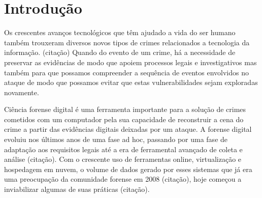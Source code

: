 \documentclass[
	12pt,				%
	openright,			%
	oneside,			%
	a4paper,			%
	english,			%
	french,				%
	spanish,			%
	brazil,				%
	]{abntex2}
\begin{document}
\frenchspacing 


\imprimircapa

\imprimirfolhaderosto


\tableofcontents
\cleardoublepage


\textual

\chapter{Introdução}

Os crescentes avanços tecnológicos que têm ajudado a vida do ser humano também trouxeram diversos novos tipos de crimes relacionados a tecnologia da informação. (citação)
Quando do evento de um crime, há a necessidade de preservar as evidências de modo que apoiem processos legais e investigativos mas também para que possamos compreender a sequência
de eventos envolvidos no ataque de modo que possamos evitar que estas vulnerabilidades sejam exploradas novamente.

\par

Ciência forense digital é uma ferramenta importante para a solução de crimes cometidos com um computador pela sua capacidade de reconstruir a cena do crime a partir das evidências
digitais deixadas por um ataque. A forense digital evoluiu nos últimos anos de uma fase ad hoc, passando por uma fase de adaptação aos requisitos legais até a era de ferramental
avançado de coleta e análise (citação). Com o crescente uso de ferramentas online, virtualização e hospedagem em nuvem, o volume de dados gerado por esses sistemas que já era uma preocupação
da comunidade forense em 2008 (citação), hoje começou a inviabilizar algumas de suas práticas (citação).  
\end{document}
